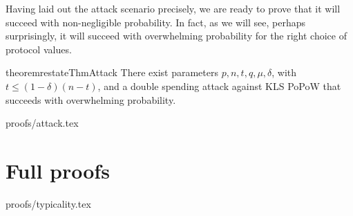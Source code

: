 Having laid out the attack scenario precisely, we are ready to prove that it
will succeed with non-negligible probability. In fact, as we will see, perhaps
surprisingly, it will succeed with overwhelming probability for the right choice
of protocol values.

\begin{restatable}{theorem}{restateThmAttack}
There exist parameters $p, n, t, q,  \mu, \delta$, with $t\leq (1-\delta)(n-t)$,
and a double spending attack against KLS PoPoW that succeeds with overwhelming
probability.
\end{restatable}
\ifonecolumn
{proofs/attack.tex}
\fi

\section{Full proofs}
\label{sec.proofs}





\restateThmTypicality
{proofs/typicality.tex}









